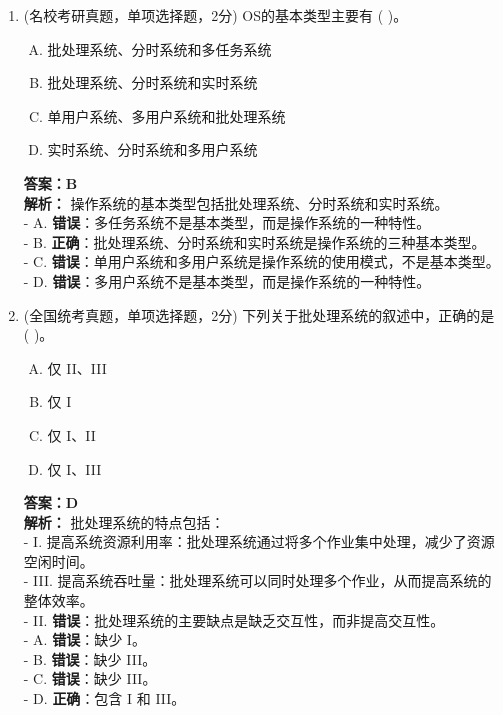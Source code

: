 \documentclass[lang=cn,newtx,10pt,scheme=chinese]{../../elegantbook}
\begin{document}
\begin{enumerate}
\item (名校考研真题，单项选择题，2分) OS的基本类型主要有 (    )。
    \begin{enumerate}[A.]
        \item 批处理系统、分时系统和多任务系统
        \item 批处理系统、分时系统和实时系统
        \item 单用户系统、多用户系统和批处理系统
        \item 实时系统、分时系统和多用户系统
    \end{enumerate}
    \textbf{答案：B}\\
    \textbf{解析：} 操作系统的基本类型包括批处理系统、分时系统和实时系统。\\
    - A. \textbf{错误}：多任务系统不是基本类型，而是操作系统的一种特性。\\
    - B. \textbf{正确}：批处理系统、分时系统和实时系统是操作系统的三种基本类型。\\
    - C. \textbf{错误}：单用户系统和多用户系统是操作系统的使用模式，不是基本类型。\\
    - D. \textbf{错误}：多用户系统不是基本类型，而是操作系统的一种特性。\\
    \item (全国统考真题，单项选择题，2分) 下列关于批处理系统的叙述中，正确的是 (    )。
    \begin{enumerate}[A.]
        \item 仅 II、III
        \item 仅 I
        \item 仅 I、II
        \item 仅 I、III
    \end{enumerate}
    \textbf{答案：D}\\
    \textbf{解析：} 批处理系统的特点包括：\\
    - I. 提高系统资源利用率：批处理系统通过将多个作业集中处理，减少了资源空闲时间。\\
    - III. 提高系统吞吐量：批处理系统可以同时处理多个作业，从而提高系统的整体效率。\\
    - II. \textbf{错误}：批处理系统的主要缺点是缺乏交互性，而非提高交互性。\\
    - A. \textbf{错误}：缺少 I。\\
    - B. \textbf{错误}：缺少 III。\\
    - C. \textbf{错误}：缺少 III。\\
    - D. \textbf{正确}：包含 I 和 III。\\


\end{enumerate}
\end{document}

